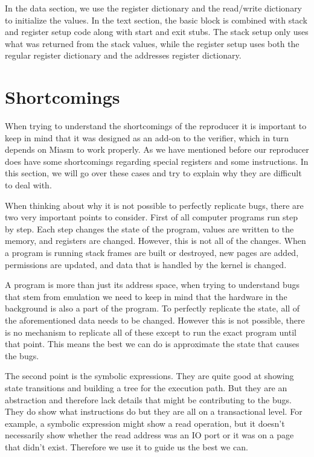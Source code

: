 In the data section, we use the register dictionary and the read/write dictionary to initialize the values.
In the text section, the basic block is combined with stack and register setup code along with start and exit stubs.
The stack setup only uses what was returned from the stack values, while the register setup uses both the regular register dictionary and the addresses register dictionary.

\section{Shortcomings}
When trying to understand the shortcomings of the reproducer it is important to keep in mind that it was designed as an add-on to the verifier, which in turn depends on Miasm to work properly.
As we have mentioned before our reproducer does have some shortcomings regarding special registers and some instructions.
In this section, we will go over these cases and try to explain why they are difficult to deal with.

When thinking about why it is not possible to perfectly replicate bugs, there are two very important points to consider.
First of all computer programs run step by step.
Each step changes the state of the program, values are written to the memory, and registers are changed.
However, this is not all of the changes.
When a program is running stack frames are built or destroyed, new pages are added, permissions are updated, and data that is handled by the kernel is changed.

A program is more than just its address space, when trying to understand bugs that stem from emulation we need to keep in mind that the hardware in the background is also a part of the program.
To perfectly replicate the state, all of the aforementioned data needs to be changed.
However this is not possible, there is no mechanism to replicate all of these except to run the exact program until that point.
This means the best we can do is approximate the state that causes the bugs.

The second point is the symbolic expressions.
They are quite good at showing state transitions and building a tree for the execution path.
But they are an abstraction and therefore lack details that might be contributing to the bugs.
They do show what instructions do but they are all on a transactional level.
For example, a symbolic expression might show a read operation, but it doesn't necessarily show whether the read address was an IO port or it was on a page that didn't exist.
Therefore we use it to guide us the best we can.

